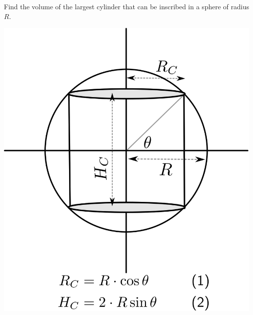 \documentclass[14pt,fleqn]{extarticle}
\begin{document}
Find the volume of the largest cylinder that
can be inscribed in a sphere of radius $R$. 
%

\newcard

\begin{center}
\includegraphics[scale=0.5]{right.svg}
\end{center}

\newcard 
\end{document}

